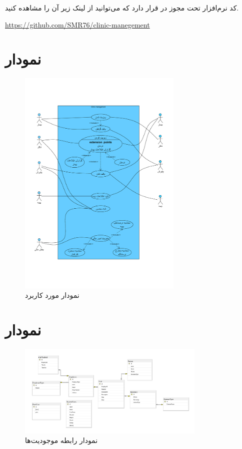 \documentclass[a4paper,12pt]{report}
\begin{document}
	کد نرم‌افزار تحت مجوز 
	در 
	قرار دارد که می‌توانید از لینک زیر آن را مشاهده کنید. 
	
	\url{https://github.com/SMR76/clinic-manegement}
	\pagebreak
	\section{
		نمودار 
	}\label{sec1:chap2}
	\vspace{-2cm}
	\begin{figure}[!h]
		\label{fig1:sec1:chap2}
		\begin{center}
			\includegraphics[width=0.7\textwidth]{diagrams/useCase.pdf}
			\caption{نمودار مورد کاربرد}
		\end{center}
	\end{figure}

	\pagebreak
	\section{
		نمودار 
		}\label{sec2:chap2}
	\begin{figure}[!h]
		\label{fig1:sec2:chap2}
		\begin{center}
			\includegraphics[width=0.8\textwidth]{diagrams/ERD.pdf}
			\caption{نمودار رابطه موجودیت‌ها}
		\end{center}
	\end{figure}
\end{document}

